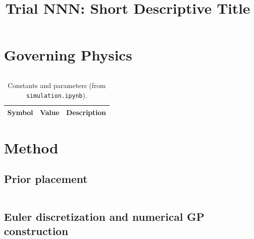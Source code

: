 \documentclass[11pt]{article}
\title{Trial NNN: Short Descriptive Title}
\author{}
\date{}
\begin{document}
\maketitle


\section{Governing Physics}

\begin{equation}
  \label{eq:levelset}
\end{equation}


\begin{table}[h]
  \centering
  \caption{Constants and parameters (from \texttt{simulation.ipynb}).}
  \begin{tabular}{@{}lll@{}}
    \toprule
    Symbol & Value & Description \\
    \midrule
    \bottomrule
  \end{tabular}
\end{table}

\section{Method}

\subsection{Prior placement}

\begin{equation}
  \label{eq:prior}
\end{equation}

\subsection{Euler discretization and numerical GP construction}

\begin{equation}
  \label{eq:euler}
\end{equation}
\end{document}
